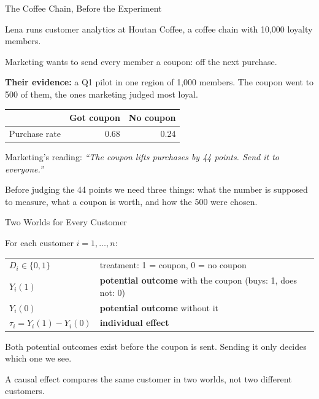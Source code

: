 \documentclass[aspectratio=169, 11pt, handout]{beamer}
\begin{document}
\begin{frame}{The Coffee Chain, Before the Experiment}

Lena runs customer analytics at Houtan Coffee, a coffee chain with 10{,}000 loyalty members.

\bigskip

Marketing wants to send every member a coupon:  off the next purchase.

\bigskip

\textbf{Their evidence:} a Q1 pilot in one region of 1{,}000 members. The coupon went to 500 of them, the ones marketing judged most loyal.

\begin{center}
\small
\begin{tabular}{lrr}
\toprule
& \textbf{Got coupon} & \textbf{No coupon} \\
\midrule
Purchase rate & 0.68 & 0.24 \\
\bottomrule
\end{tabular}
\end{center}

\smallskip
\begin{center}
Marketing's reading: \emph{``The coupon lifts purchases by 44 points. Send it to everyone.''}
\end{center}

\medskip

\small Before judging the 44 points we need three things: what the number is supposed to measure, what a coupon is worth, and how the 500 were chosen.
\end{frame}

\begin{frame}{Two Worlds for Every Customer}

For each customer $i = 1, \dots, n$:

\medskip

\begin{center}
\begin{tabular}{ll}
$D_i \in \{0, 1\}$ & treatment: 1 = coupon, 0 = no coupon \\[0.3em]
$Y_i(1)$ & \textbf{potential outcome} with the coupon (buys: 1, does not: 0) \\[0.3em]
$Y_i(0)$ & \textbf{potential outcome} without it \\[0.3em]
$\tau_i = Y_i(1) - Y_i(0)$ & \textbf{individual effect}
\end{tabular}
\end{center}

\bigskip

Both potential outcomes exist before the coupon is sent. Sending it only decides which one we see.

\bigskip

A causal effect compares the same customer in two worlds, not two different customers.
\end{frame}
\end{document}
